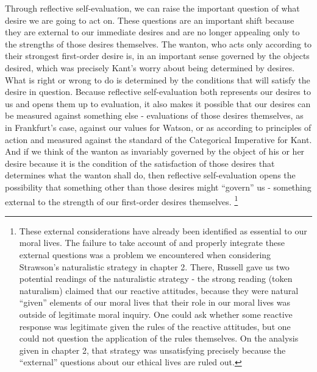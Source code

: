 \documentclass[phd,12pt,oneside,paper=letterpaper]{ubcthesis}
\begin{document}
Through reflective self-evaluation, we can raise the important question of what desire we are going to act on. These questions are an important shift because they are external to our immediate desires and are no longer appealing only to the strengths of those desires themselves. The wanton, who acts only according to their strongest first-order desire is, in an important sense governed by the objects desired, which was precisely Kant's worry about being determined by desires. What is right or wrong to do is determined by the conditions that will satisfy the desire in question. Because reflective self-evaluation both represents our desires to us and opens them up to evaluation, it also makes it possible that our desires can be measured against something else - evaluations of those desires themselves, as in Frankfurt's case, against our values for Watson, or as according to principles of action and measured against the standard of the Categorical Imperative for Kant. And if we think of the wanton as invariably governed by the object of his or her desire because it is the condition of the satisfaction of those desires that determines what the wanton shall do, then reflective self-evaluation opens the possibility that something other than those desires might ``govern'' us - something external to the strength of our first-order desires themselves. \footnote{These external considerations have already been identified as essential to our moral lives.  The failure to take account of and properly integrate these external questions was a problem we encountered when considering Strawson's naturalistic strategy in chapter 2. There, Russell gave us two potential readings of the naturalistic strategy - the strong reading (token naturalism) claimed that our reactive attitudes, because they were natural ``given'' elements of our moral lives that their role in our moral lives was outside of legitimate moral inquiry. One could ask whether some reactive response was legitimate given the rules of the reactive attitudes, but one could not question the application of the rules themselves. On the analysis given in chapter 2, that strategy was unsatisfying precisely because the ``external'' questions about our ethical lives are ruled out.  

}
\end{document}
